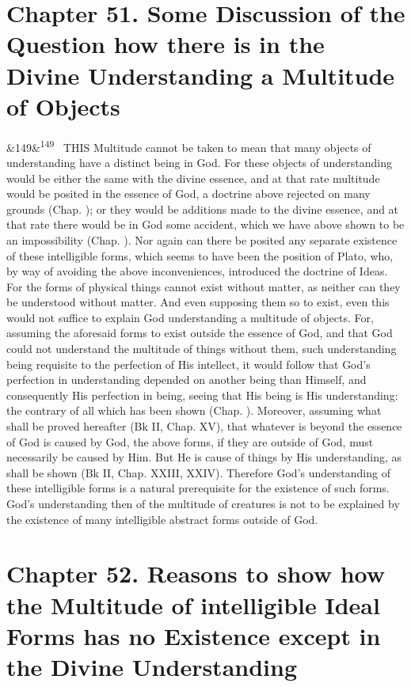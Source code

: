 \documentclass[12pt]{article}
\newcommand{\para}[1][]{\par\noindent\ifx&#1&\else\textsuperscript{\footnotesize #1}~\fi}
\begin{document}
\section*{Chapter 51. Some Discussion of the Question how there is in the Divine Understanding a Multitude of Objects}

\para[149] THIS Multitude cannot be taken to mean that many objects of understanding have a distinct being in God. For these objects of understanding would be either the same with the divine essence, and at that rate multitude would be posited in the essence of God, a doctrine above rejected on many grounds (Chap. ); or they would be additions made to the divine essence, and at that rate there would be in God some accident, which we have above shown to be an impossibility (Chap. ). Nor again can there be posited any separate existence of these intelligible forms, which seems to have been the position of Plato, who, by way of avoiding the above inconveniences, introduced the doctrine of Ideas. For the forms of physical things cannot exist without matter, as neither can they be understood without matter. And even supposing them so to exist, even this would not suffice to explain God understanding a multitude of objects. For, assuming the aforesaid forms to exist outside the essence of God, and that God could not understand the multitude of things without them, such understanding being requisite to the perfection of His intellect, it would follow that God's perfection in understanding depended on another being than Himself, and consequently His perfection in being, seeing that His being is His understanding: the contrary of all which has been shown (Chap. ). Moreover, assuming what shall be proved hereafter (Bk II, Chap. XV), that whatever is beyond the essence of God is caused by God, the above forms, if they are outside of God, must necessarily be caused by Him. But He is cause of things by His understanding, as shall be shown (Bk II, Chap. XXIII, XXIV). Therefore God's understanding of these intelligible forms is a natural prerequisite for the existence of such forms. God's understanding then of the multitude of creatures is not to be explained by the existence of many intelligible abstract forms outside of God.

\section*{Chapter 52. Reasons to show how the Multitude of intelligible Ideal Forms has no Existence except in the Divine Understanding}
\end{document}
